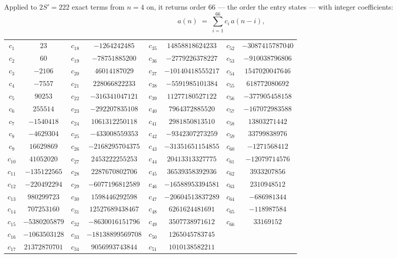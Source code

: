 \documentclass[11pt,a4paper]{article}
\theoremstyle{plain}
\theoremstyle{definition}
\begin{document}
Applied to $2S'=222$ exact terms from $n=4$ on, it returns order $66$ --- the
order the entry states --- with integer coefficients:
\[
a(n)\;=\;\sum_{i=1}^{66}c_i\,a(n-i),
\]
\begin{center}\small
\begin{tabular}{cccccccc}
$c_{1}$ & $23$ & $c_{18}$ & $-1264242485$ & $c_{35}$ & $14858818624233$ & $c_{52}$ & $-3087415787040$ \\
$c_{2}$ & $60$ & $c_{19}$ & $-78751885200$ & $c_{36}$ & $-2779226378227$ & $c_{53}$ & $-910038796806$ \\
$c_{3}$ & $-2106$ & $c_{20}$ & $46014187029$ & $c_{37}$ & $-10140418555217$ & $c_{54}$ & $1547020047646$ \\
$c_{4}$ & $-7557$ & $c_{21}$ & $228066822233$ & $c_{38}$ & $-5591985101384$ & $c_{55}$ & $618772080692$ \\
$c_{5}$ & $90253$ & $c_{22}$ & $-316341047121$ & $c_{39}$ & $11277180527122$ & $c_{56}$ & $-377905458158$ \\
$c_{6}$ & $255514$ & $c_{23}$ & $-292207835108$ & $c_{40}$ & $7964372885520$ & $c_{57}$ & $-167072983588$ \\
$c_{7}$ & $-1540418$ & $c_{24}$ & $1061312250118$ & $c_{41}$ & $2981850813510$ & $c_{58}$ & $13803271442$ \\
$c_{8}$ & $-4629304$ & $c_{25}$ & $-433008559353$ & $c_{42}$ & $-9342307273259$ & $c_{59}$ & $33799838976$ \\
$c_{9}$ & $16629869$ & $c_{26}$ & $-2168295704375$ & $c_{43}$ & $-31351651154855$ & $c_{60}$ & $-1271568412$ \\
$c_{10}$ & $41052020$ & $c_{27}$ & $2453222255253$ & $c_{44}$ & $20413313327775$ & $c_{61}$ & $-12079714576$ \\
$c_{11}$ & $-135122565$ & $c_{28}$ & $2287670802706$ & $c_{45}$ & $36539358392936$ & $c_{62}$ & $3933207856$ \\
$c_{12}$ & $-220492294$ & $c_{29}$ & $-6077196812589$ & $c_{46}$ & $-16588953394581$ & $c_{63}$ & $2310948512$ \\
$c_{13}$ & $980299723$ & $c_{30}$ & $1598446292598$ & $c_{47}$ & $-20604513837289$ & $c_{64}$ & $-686981344$ \\
$c_{14}$ & $707253160$ & $c_{31}$ & $12527689438467$ & $c_{48}$ & $6261624481691$ & $c_{65}$ & $-118987584$ \\
$c_{15}$ & $-5380205879$ & $c_{32}$ & $-8630016151796$ & $c_{49}$ & $3507738971612$ & $c_{66}$ & $33169152$ \\
$c_{16}$ & $-1063503128$ & $c_{33}$ & $-18138899569708$ & $c_{50}$ & $1265045783745$ &  &  \\
$c_{17}$ & $21372870701$ & $c_{34}$ & $9056993743844$ & $c_{51}$ & $1010138582211$ &  &  \\
\end{tabular}
\end{center}
\end{document}
